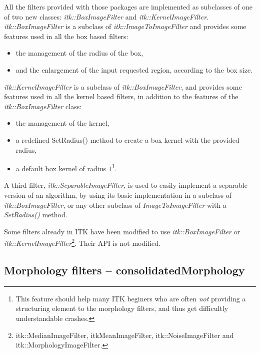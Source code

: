 \documentclass[a4paper]{InsightArticle}
\begin{document}
All the filters provided with those packages are implemented as subclasses
of one of two new classes: {\em itk::BoxImageFilter} and {\em itk::KernelImageFilter}.
{\em itk::BoxImageFilter} is a subclass of {\em itk::ImageToImageFilter} and provides
some features used in all the box based filters:
\begin{itemize}
  \item the management of the radius of the box,
  \item and the enlargement of the input requested region, according to the box size.
\end{itemize}
{\em itk::KernelImageFilter} is a subclass of {\em itk::BoxImageFilter}, and provides
some features used in all the kernel based filters, in addition to the features of the
{\em itk::BoxImageFilter} class:
\begin{itemize}
  \item the management of the kernel,
  \item a redefined SetRadius() method to create a box kernel with the provided radius,
  \item a default box kernel of radius $1$\footnote{This feature should help many ITK
beginers who are often {\em not} providing a structuring element to the morphology filters,
and thus get difficultly understandable crashes.}.
\end{itemize}

A third filter, {\em itk::SeparableImageFilter}, is used to easily implement a separable
version of an algorithm, by using its basic implementation in a subclass of
{\em itk::BoxImageFilter}, or any other subclass of {\em ImageToImageFilter} with
a {\em SetRadius()} method.

Some filters already in ITK have been modified to use {\em itk::BoxImageFilter} or
{\em itk::KernelImageFilter}\footnote{itk::MedianImageFilter, itkMeanImageFilter,
itk::NoiseImageFilter and itk::MorphologyImageFilter.}. Their API is not modified.

\subsection{Morphology filters -- consolidatedMorphology}
\end{document}
